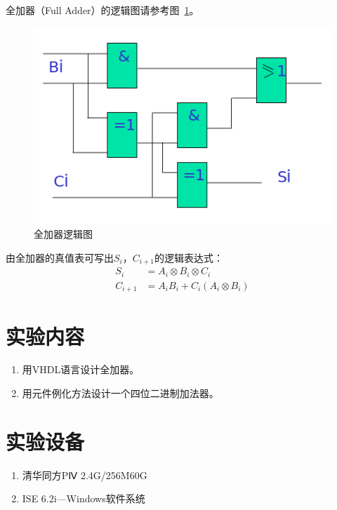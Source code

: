 \documentclass{article}
\begin{document}
\begin{CJK*}{UTF8}{gbsn}
全加器（Full Adder）的逻辑图请参考图~\ref{fig: logic}。
\begin{center}
\begin{figure}[h!]
\includegraphics[width=\textwidth]{circuit.jpg}
\caption{全加器逻辑图}
\label{fig: logic}
\end{figure}
\end{center}

由全加器的真值表可写出$S_i$，$C_{i+1}$的逻辑表达式：
\begin{equation*}
\begin{aligned}
S_i&=A_i \otimes B_i \otimes C_i \\
C_{i+1}&=A_i B_i+C_i(A_i \otimes B_i)
\end{aligned}
\end{equation*}

\section{实验内容}
\begin{enumerate}
\item 用VHDL语言设计全加器。
\item 用元件例化方法设计一个四位二进制加法器。
\end{enumerate}

\section{实验设备}
\begin{enumerate}
\item 清华同方PⅣ 2.4G/256M60G
\item ISE 6.2i—Windows软件系统
\end{enumerate}


\end{CJK*}
\end{document}
